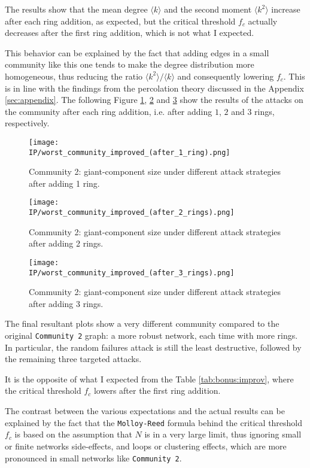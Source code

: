 \documentclass{article}
\newcommand{\IP}{../results}
\begin{document}
The results show that the mean degree $\langle k\rangle$ and the second moment $\langle k^2\rangle$ increase after each ring addition, as expected, but the critical threshold $f_c$ actually decreases after the first ring addition, which is not what I expected.

This behavior can be explained by the fact that adding edges in a small community like this one tends to make the degree distribution more homogeneous, thus reducing the ratio $\langle k^2\rangle/\langle k\rangle$ and consequently lowering $f_c$. This is in line with the findings from the percolation theory discussed in the Appendix \ref{sec:appendix}. The following Figure \ref{fig:bonus_ring1}, \ref{fig:bonus_ring2} and \ref{fig:bonus_ring3} show the results of the attacks on the community after each ring addition, i.e. after adding $1$, $2$ and $3$ rings, respectively.

\begin{figure}[H]
  \centering
  \texttt{[image: \\IP/worst\_community\_improved\_(after\_1\_ring).png]}
  \caption{Community 2: giant-component size under different attack strategies after adding 1 ring.}
  \label{fig:bonus_ring1}
\end{figure}
\begin{figure}[H]
   \centering
   \texttt{[image: \\IP/worst\_community\_improved\_(after\_2\_rings).png]}
  \caption{Community 2: giant-component size under different attack strategies after adding 2 rings.}
  \label{fig:bonus_ring2}
\end{figure}
\begin{figure}[H]
  \centering
  \texttt{[image: \\IP/worst\_community\_improved\_(after\_3\_rings).png]}
  \caption{Community 2: giant-component size under different attack strategies after adding 3 rings.}
  \label{fig:bonus_ring3}
\end{figure}

The final resultant plots show a very different community compared to the original \texttt{Community 2} graph: a more robust network, each time with more rings. In particular, the random failures attack is still the least destructive, followed by the remaining three targeted attacks.

It is the opposite of what I expected from the Table \ref{tab:bonus:improv}, where the critical threshold $f_c$ lowers after the first ring addition. 

The contrast between the various expectations and the actual results can be explained by the fact that the \texttt{Molloy-Reed} formula behind the critical threshold $f_c$ is based on the assumption that $N$ is in a very large limit, thus ignoring small or finite networks side-effects, and loops or clustering effects, which are more pronounced in small networks like \texttt{Community 2}.
\end{document}

